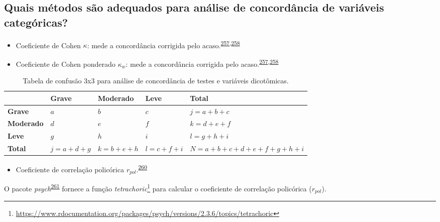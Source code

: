 \documentclass[
  a4paper,
]{book}
\providecommand{\tightlist}{%
  \setlength{\itemsep}{0pt}\setlength{\parskip}{0pt}}
\renewcommand{\href}[2]{#2\footnote{\url{#1}}}
\newenvironment{infobox}[1]
  {
  \begin{itemize}
  \renewcommand{\labelitemi}{
    \raisebox{-.7\height}[0pt][0pt]{
      {\setkeys{Gin}{width=3em,keepaspectratio}
        \texttt{[image: \#1]}}
    }
  }
  \setlength{\fboxsep}{1em}
  \begin{blackbox}
  \item
  }
  {
  \end{blackbox}
  \end{itemize}
  }
\begin{document}
\hypertarget{quais-muxe9todos-suxe3o-adequados-para-anuxe1lise-de-concorduxe2ncia-de-variuxe1veis-categuxf3ricas}{%
\subsection{Quais métodos são adequados para análise de concordância de variáveis categóricas?}\label{quais-muxe9todos-suxe3o-adequados-para-anuxe1lise-de-concorduxe2ncia-de-variuxe1veis-categuxf3ricas}}

\begin{itemize}
\item
  Coeficiente de Cohen \(\kappa\): mede a concordância corrigida pelo acaso.\textsuperscript{\protect\hyperlink{ref-scott1955}{257},\protect\hyperlink{ref-cohen1960}{258}}
\item
  Coeficiente de Cohen ponderado \(\kappa_{w}\): mede a concordância corrigida pelo acaso.\textsuperscript{\protect\hyperlink{ref-scott1955}{257},\protect\hyperlink{ref-cohen1960}{258}}
\end{itemize}

\begin{table}

\caption{\label{tab:crosstable-kappa-3x3}Tabela de confusão 3x3 para análise de concordância de testes e variáveis dicotômicas.}
\centering
\begin{tabu} to 
\toprule
\textbf{ } & \textbf{Grave} & \textbf{Moderado} & \textbf{Leve} & \textbf{Total}\\
\midrule
\textbf{Grave} & $a$ & $b$ & $c$ & $j=a+b+c$\\
\textbf{Moderado} & $d$ & $e$ & $f$ & $k=d+e+f$\\
\textbf{Leve} & $g$ & $h$ & $i$ & $l=g+h+i$\\
\textbf{Total} & $j=a+d+g$ & $k=b+e+h$ & $l=c+f+i$ & $N=a+b+c+d+e+f+g+h+i$\\
\bottomrule
\end{tabu}
\end{table}

\begin{itemize}
\tightlist
\item
  Coeficiente de correlação policórica \(r_{pol}\).\textsuperscript{\protect\hyperlink{ref-banerjee1999}{260}}
\end{itemize}

\begin{infobox}{images/Rlogo}
O pacote \emph{psych}\textsuperscript{\protect\hyperlink{ref-psych}{261}} fornece a função \href{https://www.rdocumentation.org/packages/psych/versions/2.3.6/topics/tetrachoric}{\emph{tetrachoric}} para calcular o coeficiente de correlação policórica (\(r_{pol}\)).

\end{infobox}
\end{document}
